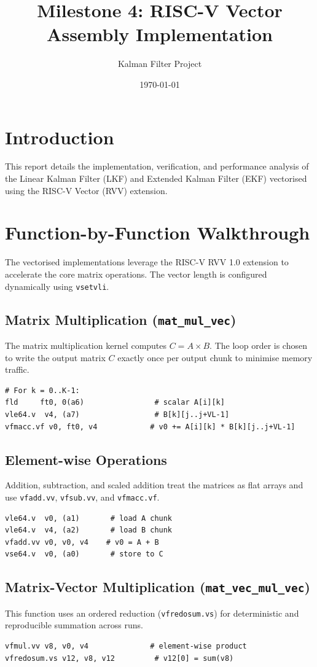 \documentclass{article}
\title{Milestone 4: RISC-V Vector Assembly Implementation}
\author{Kalman Filter Project}
\date{\today}
\begin{document}
\maketitle

\section{Introduction}
This report details the implementation, verification, and performance analysis of the Linear Kalman Filter (LKF) and Extended Kalman Filter (EKF) vectorised using the RISC-V Vector (RVV) extension.

\section{Function-by-Function Walkthrough}
The vectorised implementations leverage the RISC-V RVV 1.0 extension to accelerate the core matrix operations. The vector length is configured dynamically using \texttt{vsetvli}.

\subsection{Matrix Multiplication (\texttt{mat\_mul\_vec})}
The matrix multiplication kernel computes $C = A \times B$. The loop order is chosen to write the output matrix $C$ exactly once per output chunk to minimise memory traffic.
\begin{verbatim}
# For k = 0..K-1:
fld     ft0, 0(a6)                # scalar A[i][k]
vle64.v  v4, (a7)                 # B[k][j..j+VL-1]
vfmacc.vf v0, ft0, v4            # v0 += A[i][k] * B[k][j..j+VL-1]
\end{verbatim}

\subsection{Element-wise Operations}
Addition, subtraction, and scaled addition treat the matrices as flat arrays and use \texttt{vfadd.vv}, \texttt{vfsub.vv}, and \texttt{vfmacc.vf}.
\begin{verbatim}
vle64.v  v0, (a1)       # load A chunk
vle64.v  v4, (a2)       # load B chunk
vfadd.vv v0, v0, v4    # v0 = A + B
vse64.v  v0, (a0)       # store to C
\end{verbatim}

\subsection{Matrix-Vector Multiplication (\texttt{mat\_vec\_mul\_vec})}
This function uses an ordered reduction (\texttt{vfredosum.vs}) for deterministic and reproducible summation across runs.
\begin{verbatim}
vfmul.vv v8, v0, v4              # element-wise product
vfredosum.vs v12, v8, v12         # v12[0] = sum(v8)
\end{verbatim}
\end{document}
